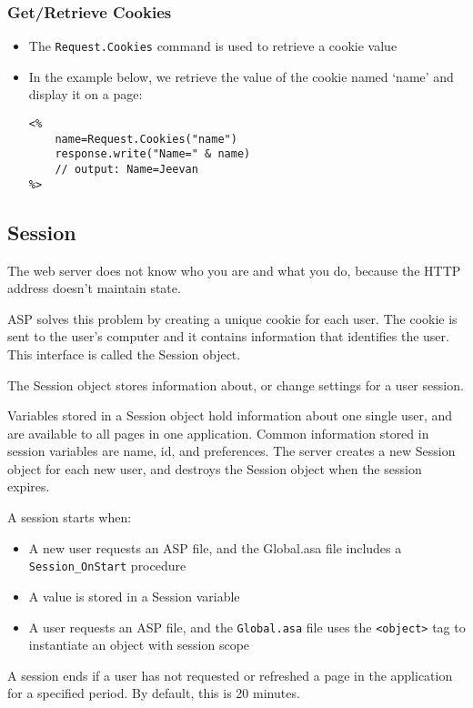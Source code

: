 \subsubsection{Get/Retrieve Cookies}
\begin{itemize}
\item The \verb*|Request.Cookies| command is used to retrieve a cookie value
\item In the example below, we retrieve the value of the cookie named `name' and display it on a page:
\begin{lstlisting}
<%
	name=Request.Cookies("name")
	response.write("Name=" & name)
	// output: Name=Jeevan
%>
\end{lstlisting}



\end{itemize}


\subsection{Session}
The web server does not know who you are and what you do, because the HTTP address doesn't maintain state. 


ASP solves this problem by creating a unique cookie for each user. The cookie is sent to the user's computer and it contains information that identifies the user. This interface is called the Session object. 

The Session object stores information about, or change settings for a user session.

Variables stored in a Session object hold information about one single user, and are available to all pages in one application. Common information stored in session variables are name, id, and preferences. The server creates a new Session object for each new user, and destroys the Session object when the session expires.

A session starts when:

\begin{itemize}
	\item A new user requests an ASP file, and the Global.asa file includes a \verb*|Session_OnStart| procedure
	\item A value is stored in a Session variable
	\item A user requests an ASP file, and the \verb*|Global.asa| file uses the \verb*|<object>| tag to instantiate an object with session scope
\end{itemize}
A session ends if a user has not requested or refreshed a page in the application for a specified period. By default, this is 20 minutes.

